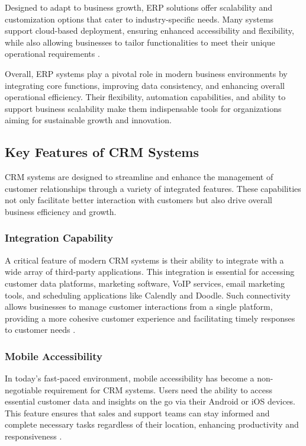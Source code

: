 Designed to adapt to business growth, ERP solutions offer scalability and customization options that cater to industry-specific needs. Many systems support cloud-based deployment, ensuring enhanced accessibility and flexibility, while also allowing businesses to tailor functionalities to meet their unique operational requirements \cite{sap_features, oracle_erp}.

Overall, ERP systems play a pivotal role in modern business environments by integrating core functions, improving data consistency, and enhancing overall operational efficiency. Their flexibility, automation capabilities, and ability to support business scalability make them indispensable tools for organizations aiming for sustainable growth and innovation.


\subsection{ Key Features of CRM Systems}
CRM systems are designed to streamline and enhance the management of customer relationships through a variety of integrated features. These capabilities not only facilitate better interaction with customers but also drive overall business efficiency and growth.

\subsubsection{Integration Capability}
A critical feature of modern CRM systems is their ability to integrate with a wide array of third-party applications. This integration is essential for accessing customer data platforms, marketing software, VoIP services, email marketing tools, and scheduling applications like Calendly and Doodle. Such connectivity allows businesses to manage customer interactions from a single platform, providing a more cohesive customer experience and facilitating timely responses to customer needs \cite{forbes_crm}.

\subsubsection{Mobile Accessibility}
In today's fast-paced environment, mobile accessibility has become a non-negotiable requirement for CRM systems. Users need the ability to access essential customer data and insights on the go via their Android or iOS devices. This feature ensures that sales and support teams can stay informed and complete necessary tasks regardless of their location, enhancing productivity and responsiveness \cite{forbes_crm}.

